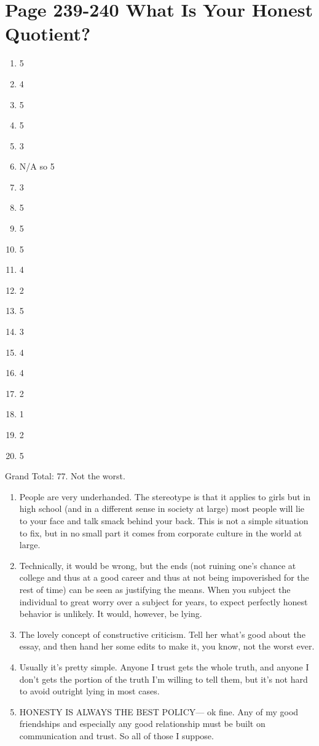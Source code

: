\documentclass[11pt]{article}
\begin{document}
\section{Page 239-240 What Is Your Honest Quotient?}
\begin{enumerate}
	\item 5
	\item 4
	\item 5
	\item 5
	\item 3
	\item N/A so 5
	\item 3
	\item 5
	\item 5
	\item 5
	\item 4
	\item 2
	\item 5
	\item 3
	\item 4
	\item 4
	\item 2
	\item 1
	\item 2
	\item 5
\end{enumerate}
Grand Total: 77.  Not the worst.
\begin{enumerate}
	\item People are very underhanded.  The stereotype is that it applies to girls
		but in high school (and in a different sense in society at large) most
		people will lie to your face and talk smack behind your back.  This is not
		a simple situation to fix, but in no small part it comes from corporate
		culture in the world at large.
	\item Technically, it would be wrong, but the ends (not ruining one's chance
		at college and thus at a good career and thus at not being impoverished for
		the rest of time) can be seen as justifying the means.  When you subject the
		individual to great worry over a subject for years, to expect perfectly
		honest behavior is unlikely.  It would, however, be lying.
	\item The lovely concept of constructive criticism.  Tell her what's good
		about the essay, and then hand her some edits to make it, you know, not the
		worst ever.
	\item Usually it's pretty simple.  Anyone I trust gets the whole truth, and 
		anyone I don't gets the portion of the truth I'm willing to tell them, but 
		it's not hard to avoid outright lying in most cases.
	\item HONESTY IS ALWAYS THE BEST POLICY--- ok fine.  Any of my good 
		friendships and especially any good relationship must be built on 
		communication and trust.  So all of those I suppose.
\end{enumerate}
\end{document}
